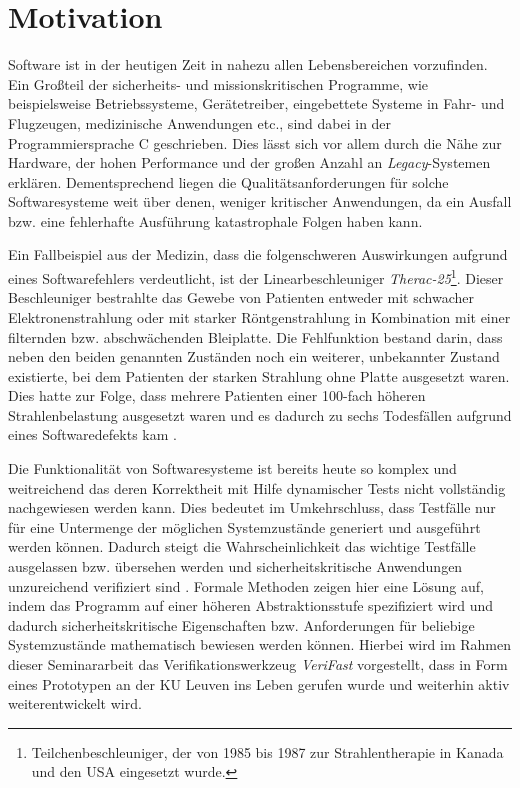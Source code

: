 \section{Motivation}

Software ist in der heutigen Zeit in nahezu allen Lebensbereichen vorzufinden. Ein Großteil der sicherheits- und missionskritischen Programme, wie beispielsweise Betriebssysteme, Gerätetreiber, eingebettete Systeme in Fahr- und Flugzeugen, medizinische Anwendungen etc.,  sind dabei in der Programmiersprache C geschrieben. Dies lässt sich vor allem durch die Nähe zur Hardware, der hohen Performance und der großen Anzahl an \emph{Legacy}-Systemen erklären. Dementsprechend liegen die Qualitätsanforderungen für solche Softwaresysteme weit über denen, weniger kritischer Anwendungen, da ein Ausfall bzw. eine fehlerhafte Ausführung katastrophale Folgen haben kann.

Ein Fallbeispiel aus der Medizin, dass die folgenschweren Auswirkungen aufgrund eines Softwarefehlers verdeutlicht, ist der Linearbeschleuniger \emph{Therac-25}\footnote{Teilchenbeschleuniger, der von 1985 bis 1987 zur Strahlentherapie in Kanada und den USA eingesetzt wurde.}. Dieser Beschleuniger bestrahlte das Gewebe von Patienten entweder mit schwacher Elektronenstrahlung oder mit starker Röntgenstrahlung in Kombination mit einer filternden bzw. abschwächenden Bleiplatte. Die Fehlfunktion bestand darin, dass neben den beiden genannten Zuständen noch ein weiterer, unbekannter Zustand existierte, bei dem Patienten der starken Strahlung ohne Platte ausgesetzt waren. Dies hatte zur Folge, dass mehrere Patienten einer 100-fach höheren Strahlenbelastung ausgesetzt waren und es dadurch zu sechs Todesfällen aufgrund eines Softwaredefekts kam \cite{Pfeifer2003,Leveson1993}.

Die Funktionalität von Softwaresysteme ist bereits heute so komplex und weitreichend das deren Korrektheit mit Hilfe dynamischer Tests nicht vollständig nachgewiesen werden kann. Dies bedeutet im Umkehrschluss, dass Testfälle nur für eine Untermenge der möglichen Systemzustände generiert und ausgeführt werden können. Dadurch steigt die Wahrscheinlichkeit das wichtige Testfälle ausgelassen bzw. übersehen werden und sicherheitskritische Anwendungen unzureichend verifiziert sind \cite{Crocker2007}. Formale Methoden zeigen hier eine Lösung auf, indem das Programm auf einer höheren Abstraktionsstufe spezifiziert wird und dadurch sicherheitskritische Eigenschaften bzw. Anforderungen für beliebige Systemzustände mathematisch bewiesen werden können. Hierbei wird im Rahmen dieser Seminararbeit das Verifikationswerkzeug \emph{VeriFast} vorgestellt, dass in Form eines Prototypen an der KU Leuven ins Leben gerufen wurde und weiterhin aktiv weiterentwickelt wird.
